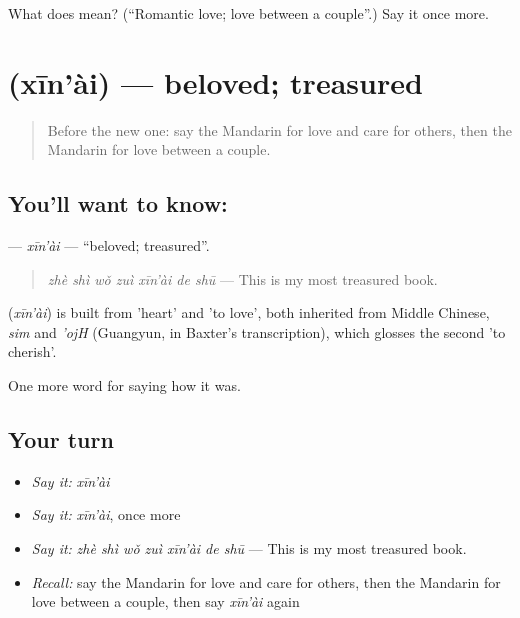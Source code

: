 \begin{tcolorbox}[breakable,colback=teal!4,colframe=teal!35!black,title={Before you move on}]
What does  mean? (\textquotedblleft{}Romantic love; love between a couple\textquotedblright{}.) Say it once more.
\end{tcolorbox}
\section[\texorpdfstring{\zh{心爱} (xīn'ài)}{心爱 (xīn'ài)}]{ (xīn'ài) — beloved; treasured}

\label{lesson:ZH-C461-xinai}



\begin{quote}
Before the new one: say the Mandarin for love and care for others, then the Mandarin for love between a couple.
\end{quote}

\subsection*{You'll want to know: }
\textbf{} — \emph{xīn'ài} — \textquotedblleft{}beloved; treasured\textquotedblright{}.

\begin{quote}
\textbf{} \emph{zhè shì wǒ zuì xīn'ài de shū} — This is my most treasured book.
\end{quote}

\begin{cousinweb}
\textbf{} (\emph{xīn'ài}) is built from  'heart' and  'to love', both inherited from Middle Chinese, \emph{sim} and \emph{'ojH} (Guangyun, in Baxter's transcription), which glosses the second 'to cherish'.
\end{cousinweb}

\begin{grammarlens}[title={What you've built}]
One more word for saying how it was.
\end{grammarlens}

\subsection*{Your turn}
\begin{itemize}
\raggedright
  \item \emph{Say it:} \emph{xīn'ài}
  \item \emph{Say it:} \emph{xīn'ài}, once more
  \item \emph{Say it:} \emph{zhè shì wǒ zuì xīn'ài de shū} — This is my most treasured book.
  \item \emph{Recall:} say the Mandarin for love and care for others, then the Mandarin for love between a couple, then say \emph{xīn'ài} again
\end{itemize}

